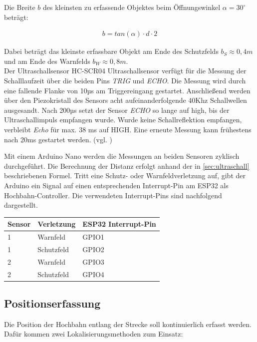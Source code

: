 Die Breite $b$ des kleinsten zu erfassende Objektes beim Öffnungswinkel $\alpha = 30^{\circ}$ beträgt:

\begin{align}
	b= tan(\alpha) \cdot d \cdot 2
\end{align}

 Dabei beträgt das kleinste erfassbare Objekt am Ende des Schutzfelds $b_S \approx 0,4m$ und am Ende des Warnfelds $b_W \approx 0,8m$. \\
 
Der Ultraschallsensor HC-SCR04 Ultraschallsensor verfügt für die Messung der Schalllaufzeit über die beiden Pins \textit{TRIG} und \textit{ECHO}. Die Messung wird durch eine fallende Flanke von 10µs am Triggereingang gestartet. Anschließend werden über den  Piezokristall des Sensors acht aufeinanderfolgende 40Khz Schallwellen ausgesandt. Nach 200µs setzt der Sensor \textit{ECHO} so lange auf high, bis der Ultraschallimpuls empfangen wurde. Wurde keine Schallreflektion empfangen, verbleibt  \textit{Echo} für max. 38 ms auf HIGH. Eine erneute Messung kann frühestens nach 20ms gestartet werden. (vgl. \cite{hcrs04})

Mit einem Arduino Nano werden die Messungen an beiden Sensoren zyklisch durchgeführt. Die Berechnung der Distanz erfolgt anhand der in \autoref{sec:ultraschall} beschriebenen Formel. Tritt eine Schutz- oder Warnfeldverletzung auf, gibt der Arduino ein Signal auf einen entsprechenden Interrupt-Pin am ESP32 als  Hochbahn-Controller. Die verwendeten Interrupt-Pins sind nachfolgend dargestellt. \\


\begin{center}
	\begin{tabular}[h]{l|l|l}
		Sensor & Verletzung  & ESP32 Interrupt-Pin \\
		\hline
		1 & Warnfeld & GPIO1\\
		\hline
		1 & Schutzfeld & GPIO2\\
		\hline
		2 & Warnfeld & GPIO3\\
		\hline
		2 & Schutzfeld & GPIO4\\	
	\end{tabular}
\end{center}
\newpage

\subsection{Positionserfassung}
\label{konzeptPositionserfassung}
Die Position der Hochbahn entlang der Strecke soll kontinuierlich erfasst werden. Dafür kommen zwei Lokalisierungsmethoden zum Einsatz: 

